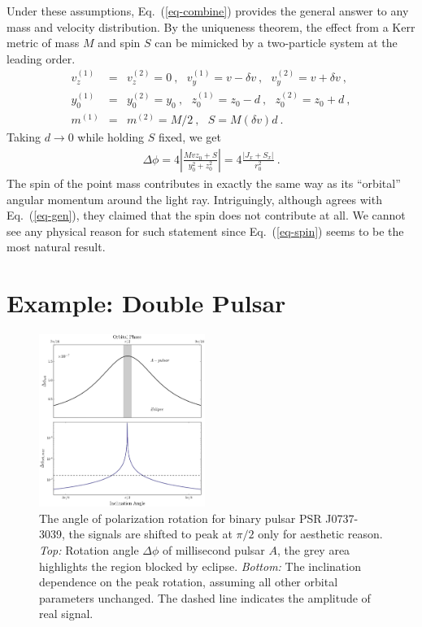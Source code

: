 \documentclass[aps,showpacs,twocolumn,floats,prd,superscriptaddress,nofootinbib]{revtex4-1}
\begin{document}
Under these assumptions, Eq.~(\ref{eq-combine}) provides the general answer to any mass and velocity distribution. 
By the uniqueness theorem, the effect from a Kerr metric of mass $M$ and spin $S$ can be mimicked by a two-particle system at the leading order.
\begin{eqnarray}
v_z^{(1)} &=& v_z^{(2)} = 0~,  \ \ \ v_y^{(1)} = v -\delta v~, \ \ \ v_y^{(2)} = v + \delta v~, \nonumber \\
y_0^{(1)} &=& y_0^{(2)} = y_0~, \ \ \ z_0^{(1)} = z_0-d~, \ \ \ z_0^{(2)} = z_0 + d~, \nonumber \\
m^{(1)} &=& m^{(2)} = M/2~, \ \ \ S = M (\delta v) d~. 
\end{eqnarray}
Taking $d\rightarrow0$ while holding $S$ fixed, we get
\begin{eqnarray}
\Delta \phi = 4\left|\frac{Mvz_0 + S}{y_0^2 + z_0^2}\right| = 4 \frac{\left| J_x + S_x \right|}{r_0^2}~.
\label{eq-spin}
\end{eqnarray}
The spin of the point mass contributes in exactly the same way as its ``orbital'' angular momentum around the light ray. Intriguingly, although \cite{KopMas01} agrees with Eq.~(\ref{eq-gen}), they claimed that the spin does not contribute at all. We cannot see any physical reason for such statement since Eq.~(\ref{eq-spin}) seems to be the most natural result.









\section{Example: Double Pulsar}
\label{sec-prediction}


\begin{figure}
\includegraphics[width=0.48\textwidth]{rotang.eps}
\caption{\label{fig:rotang}
The angle of polarization rotation for binary pulsar PSR J0737-3039, the signals are shifted to peak at $\pi/2$ only for aesthetic reason. 
{\it Top:} Rotation angle $\Delta \phi$ of millisecond pulsar $A$, the grey area highlights the region blocked by eclipse. 
{\it Bottom:}  The inclination dependence on the peak rotation, assuming all other orbital parameters unchanged. The dashed line indicates the amplitude of real signal.
 }
\end{figure}
\end{document}
